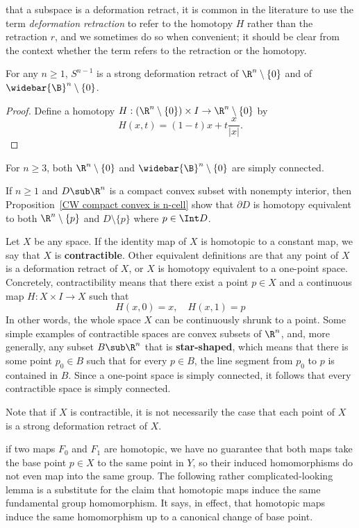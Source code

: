 that a subspace is a deformation retract, it is common in the literature to use the term \textit{deformation retraction} to refer to the homotopy $H$ rather than the retraction $r$, and we sometimes do so when convenient; it should be clear from the context whether the term refers to the retraction or the homotopy.
\begin{proposition}
For any $n\geq 1$, $S^{n-1}$ is a strong deformation retract of $\R^n\setminus\{0\}$ and of $\widebar{\B}^n\setminus\{0\}$.
\end{proposition}
\begin{proof}
Define a homotopy $H:(\R^n\setminus\{0\})\times I\to\R^n\setminus\{0\}$ by
\[H(x,t)=(1-t)x+t\dfrac{x}{|x|}.\]
\end{proof}
\begin{corollary}
For $n\geq 3$, both $\R^n\setminus\{0\}$ and $\widebar{\B}^n\setminus\{0\}$ are simply connected.
\end{corollary}
\begin{example}
If $n\geq1$ and $D\sub\R^n$ is a compact convex subset with nonempty
interior, then Proposition~\ref{CW compact convex is n-cell} show that $\partial D$ is homotopy equivalent to both $\R^n\setminus\{p\}$ and $D\setminus\{p\}$ where $p\in\Int D$.
\end{example}
\begin{example}
Let $X$ be any space. If the identity map of $X$ is homotopic to a constant map, we say that $X$ is \textbf{contractible}. Other equivalent definitions are that any point of $X$ is a deformation retract of $X$, or $X$ is homotopy equivalent to a one-point space. Concretely, contractibility means that there exist a point $p\in X$ and a continuous map $H:X\times I\to X$ such that
\[H(x,0)=x,\quad H(x,1)=p\]
In other words, the whole space $X$ can be continuously shrunk to a point. Some
simple examples of contractible spaces are convex subsets of $\R^n$, and, more generally, any subset $B\sub\R^n$ that is \textbf{star-shaped}, which means that there is some point $p_0\in B$ such that for every $p\in B$, the line segment from $p_0$ to $p$ is contained in $B$. Since a one-point space is simply connected, it follows that every contractible space is simply connected.
\end{example}
Note that if $X$ is contractible, it is not necessarily the case that each point of $X$ is a strong deformation retract of $X$.\par
if two maps $F_0$ and $F_1$ are homotopic, we have no guarantee that both maps take the base point $p\in X$ to the same point in $Y$, so their induced homomorphisms do not even map into the same group. The following rather complicated-looking lemma is a substitute for the claim that homotopic maps induce the same fundamental group homomorphism. It says, in effect, that homotopic maps induce the same homomorphism up to a canonical change of base point.
